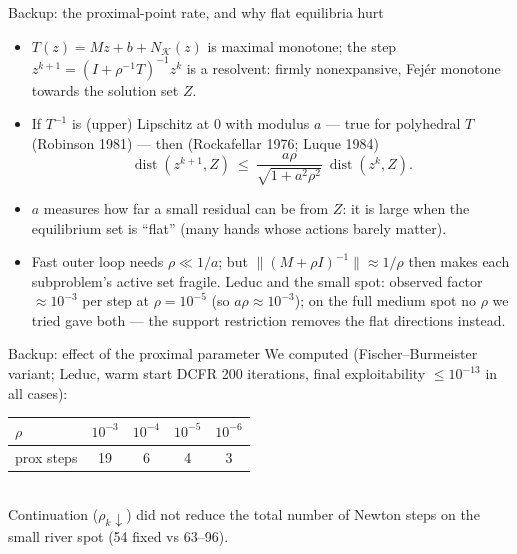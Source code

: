 \documentclass[10pt,aspectratio=169]{beamer}
\begin{document}
\begin{frame}{Backup: the proximal-point rate, and why flat equilibria hurt}
\begin{itemize}\setlength\itemsep{6pt}
\item $T(z) = Mz + b + N_{\mathcal K}(z)$ is maximal monotone; the step $z^{k+1} = (I + \rho^{-1}T)^{-1}z^k$ is a resolvent: firmly
      nonexpansive, Fej\'er monotone towards the solution set $Z$.
\item If $T^{-1}$ is (upper) Lipschitz at $0$ with modulus $a$ --- true for polyhedral $T$ (Robinson 1981) --- then
      (Rockafellar 1976; Luque 1984)
      \[ \operatorname{dist}(z^{k+1}, Z) \ \le\ \frac{a\rho}{\sqrt{1 + a^2\rho^2}}\ \operatorname{dist}(z^k, Z). \]
\item $a$ measures how far a small residual can be from $Z$: it is large when the equilibrium set is ``flat'' (many
      hands whose actions barely matter).
\item Fast outer loop needs $\rho \ll 1/a$; but $\|(M+\rho I)^{-1}\|\approx 1/\rho$ then makes each subproblem's
      active set fragile. Leduc and the small spot: observed factor $\approx10^{-3}$ per step at $\rho=10^{-5}$ (so $a\rho\approx10^{-3}$); on the full medium spot no $\rho$ we tried gave both --- the support restriction removes the flat directions instead.
\end{itemize}
\end{frame}

\begin{frame}{Backup: effect of the proximal parameter}
\small We computed (Fischer--Burmeister variant; Leduc, warm start DCFR 200 iterations, final exploitability $\le 10^{-13}$ in all cases):\\[6pt]
\begin{tabular}{lcccc}
\toprule
$\rho$ & $10^{-3}$ & $10^{-4}$ & $10^{-5}$ & $10^{-6}$ \\ \midrule
prox steps & 19 & 6 & 4 & 3 \\ \bottomrule
\end{tabular}\\[10pt]
Continuation ($\rho_k \downarrow$) did not reduce the total number of Newton steps on the small river spot (54 fixed vs 63--96).
\end{frame}
\end{document}
